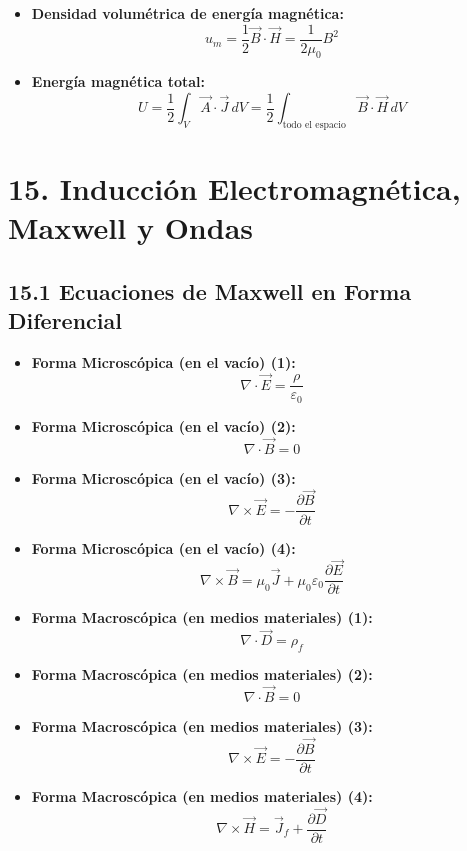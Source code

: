 \documentclass[11pt,a4paper]{article}
\begin{document}
\begin{itemize}
  \item \textbf{Densidad volumétrica de energía magnética:}
  \[
    u_m = \frac{1}{2} \vec{B} \cdot \vec{H} = \frac{1}{2\mu_0} B^2
  \]
  \item \textbf{Energía magnética total:}
  \[
    U = \frac{1}{2} \int_V \vec{A} \cdot \vec{J} \, dV = \frac{1}{2} \int_{\text{todo el espacio}} \vec{B} \cdot \vec{H} \, dV
  \]
\end{itemize}

\section*{15. Inducción Electromagnética, Maxwell y Ondas}

\subsection*{15.1 Ecuaciones de Maxwell en Forma Diferencial}

\begin{itemize}
  \item \textbf{Forma Microscópica (en el vacío) (1):}
  \[
    \nabla \cdot \vec{E} = \frac{\rho}{\varepsilon_0}
  \]
  \item \textbf{Forma Microscópica (en el vacío) (2):}
  \[
    \nabla \cdot \vec{B} = 0
  \]
  \item \textbf{Forma Microscópica (en el vacío) (3):}
  \[
    \nabla \times \vec{E} = -\frac{\partial \vec{B}}{\partial t}
  \]
  \item \textbf{Forma Microscópica (en el vacío) (4):}
  \[
    \nabla \times \vec{B} = \mu_0 \vec{J} + \mu_0 \varepsilon_0 \frac{\partial \vec{E}}{\partial t}
  \]
  \item \textbf{Forma Macroscópica (en medios materiales) (1):}
  \[
    \nabla \cdot \vec{D} = \rho_f
  \]
  \item \textbf{Forma Macroscópica (en medios materiales) (2):}
  \[
    \nabla \cdot \vec{B} = 0
  \]
  \item \textbf{Forma Macroscópica (en medios materiales) (3):}
  \[
    \nabla \times \vec{E} = -\frac{\partial \vec{B}}{\partial t}
  \]
  \item \textbf{Forma Macroscópica (en medios materiales) (4):}
  \[
    \nabla \times \vec{H} = \vec{J}_f + \frac{\partial \vec{D}}{\partial t}
  \]
\end{itemize}
\end{document}
